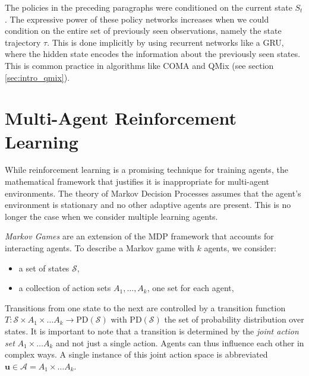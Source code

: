The policies in the preceding paragraphs were conditioned on the current state $S_t$. The expressive power of these policy networks increases when we could condition on the entire set of previously seen observations, namely the state trajectory $\tau$. This is done implicitly by using recurrent networks like a GRU, where the hidden state encodes the information about the previously seen states. This is common practice in algorithms like COMA and QMix (see section \ref{sec:intro_qmix}).
\section{Multi-Agent Reinforcement Learning}
\label{sec:intro_marl}
While reinforcement learning is a promising technique for training agents, the mathematical framework that justifies it is inappropriate for multi-agent environments. The theory of Markov Decision Processes assumes that the agent's environment is stationary and no other adaptive agents are present. This is no longer the case when we consider multiple learning agents.

\emph{Markov Games} \cite{littman1994markov} are an extension of the MDP framework that accounts for interacting agents. To describe a Markov game with $k$ agents, we consider:
\begin{itemize}
    \item a set of states $\mathcal{S}$,
    \item a collection of action sets $A_1, \ldots, A_k$, one set for each agent,
\end{itemize}
Transitions from one state to the next are controlled by a transition function $T: \mathcal{S} \times A_1 \times \ldots A_k \rightarrow \text{PD}(\mathcal{S})$ with $\text{PD}(\mathcal{S})$ the set of probability distribution over states. It is important to note that a transition is determined by the \emph{joint action set} $A_1 \times \ldots A_k$ and not just a single action. Agents can thus influence each other in complex ways. A single instance of this joint action space is abbreviated $\bm{u} \in \mathcal{A} = A_1 \times \ldots A_k$. 

